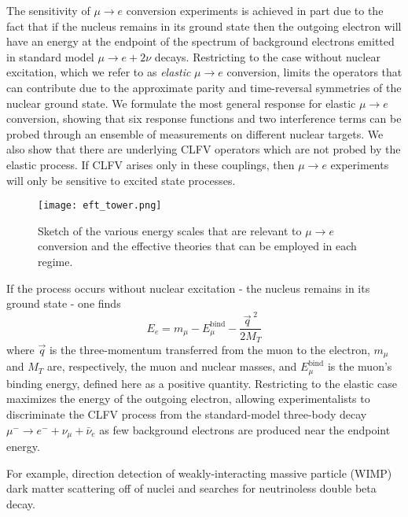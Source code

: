 \documentclass{book}[12pt]
\begin{document}
The sensitivity of $\mu\rightarrow e$ conversion experiments is achieved in part due to the fact that if the nucleus remains in its ground state then the outgoing electron will have an energy at the endpoint of the spectrum of background electrons emitted in standard model $\mu\rightarrow e + 2\nu$ decays. Restricting to the case without nuclear excitation, which we refer to as \textit{elastic} $\mu\rightarrow e$ conversion, limits the operators that can contribute due to the approximate parity and time-reversal symmetries of the nuclear ground state. We formulate the most general response for elastic $\mu\rightarrow e$ conversion, showing that six response functions and two interference terms can be probed through an ensemble of measurements on different nuclear targets. We also show that there are underlying CLFV operators which are not probed by the elastic process. If CLFV arises only in these couplings, then $\mu\rightarrow e$ experiments will only be sensitive to excited state processes.

\begin{figure}
\centering
\texttt{[image: eft\_tower.png]}
\caption{Sketch of the various energy scales that are relevant to $\mu\rightarrow e$ conversion and the effective theories that can be employed in each regime.}
\label{fig:eft_tower}
\end{figure}

If the process occurs without nuclear excitation - the nucleus remains in its ground state - one finds
\begin{equation}
E_e=m_{\mu}-E_{\mu}^\mathrm{bind}-\frac{\vec{q}^{\;2}}{2M_T}
\end{equation}
where $\vec{q}$ is the three-momentum transferred from the muon to the electron, $m_{\mu}$ and $M_T$ are, respectively, the muon and nuclear masses, and $E_{\mu}^\mathrm{bind}$ is the muon's binding energy, defined here as a positive quantity. Restricting to the elastic case maximizes the energy of the outgoing electron, allowing experimentalists to discriminate the CLFV process from the standard-model three-body decay $\mu^-\rightarrow e^-+\nu_{\mu}+\bar{\nu}_e$ as few background electrons are produced near the endpoint energy. 

For example, direction detection of weakly-interacting massive particle (WIMP) dark matter scattering off of nuclei and searches for neutrinoless double beta decay. 
\end{document}
